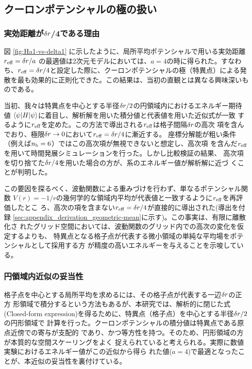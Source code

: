 \documentclass[wabun2025.tex]{subfiles}
\begin{document}
\subsection{クーロンポテンシャルの極の扱い}
\label{sec:coulomb-potential-handling-analysis}
\subsubsection{実効距離が$\delta r$/4である理由}
図 \ref{fig:Ha1-vs-delta1} に示したように、局所平均ポテンシャルで用いる実効距離
$r_{\mathrm{eff}}=\delta r/a$ の最適値は2次元モデルにおいては、$a=4$の時に得られた。すなわ
ち、$r_{\mathrm{eff}}=\delta r/4$と設定した際に、クーロンポテンシャルの極（特異点）による発
散を最も効果的に正則化できた。この結果は、当初の直観とは異なる興味深いものである。

当初、我々は特異点を中心とする半径$\delta r/2$の円領域内におけるエネルギー期待値
$\braket{\psi|H|\psi}$に着目し、解析解を用いた積分値と代表値を用いた近似式が一致
するように$r_{\mathrm{eff}}$を定めた。この方法で導出される$r_{\mathrm{eff}}$は格子間隔$\delta r$の高次
項を含んでおり、極限$\delta r\rightarrow0$において$r_{\mathrm{eff}}=\delta r/4$に漸近する。
座標分解能が粗い条件（例えば$n_{\mathrm{b}}=6$）ではこの高次項が無視できないと想定し、高次項
を含んだ$r_{\mathrm{eff}}$を用いて時間発展シミュレーションを行った。しかし比較検証の結果、
高次項を切り捨てた$\delta r/4$を用いた場合の方が、系のエネルギー値が解析解に近づ
くことが判明した。

この要因を探るべく、波動関数による重みづけを行わず、単なるポテンシャル関数
$V(r)=-1/r$の幾何学的な領域内平均が代表値と一致するように$r_{\mathrm{eff}}$を再評価したとこ
ろ、高次の項を含まない$r_{\mathrm{eff}}=\delta r/4$が直接的に導出された(導出を付録
\ref{sec:appendix_derivation_geometric-mean}に示す)。この事実は、有限に離散化さ
れたグリッド空間においては、波動関数のグリッド内での高次の変化を仮定するよりも、
特異点となる格子点が代表する微小領域の単純な平均場をポテンシャルとして採用する方
が精度の高いエネルギーを与えることを示唆している。

\subsubsection{円領域内近似の妥当性}

格子点を中心とする局所平均を求めるには、その格子点が代表する一辺$\delta r$の正方
形領域で積分するという方法もあるが、本研究では、解析的に閉じた式(Closed-form
expression)を得るために、特異点（格子点）を中心とする半径$\delta r/2$の円形領域で
計算を行った。クーロンポテンシャルの積分値は特異点である原点近傍での寄与が支配的
であり、かつ等方性を持つ。そのため、円形領域の方が本質的な空間スケーリングをよく
捉えられていると考えられる。実際に数値実験におけるエネルギー値がこの近似から得ら
れた値($a=4$)で最適となったことが、本近似の妥当性を裏付けている。
\end{document}
